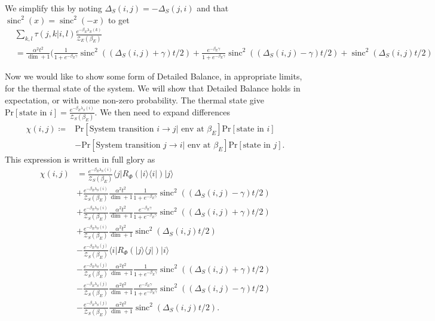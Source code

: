 \documentclass{article}
\newcommand{\ket}[1]{|#1\rangle}
\newcommand{\bra}[1]{\langle #1|}
\newcommand{\ketbra}[2]{| #1\rangle\! \langle #2|}
\newcommand{\prob}[1]{\text{Pr}\left[ #1 \right]}
\newcommand{\partfun}{\mathcal{Z}}
\DeclareMathOperator{\sinc}{sinc}
\begin{document}
We simplify this by noting $\Delta_S(i,j) = - \Delta_S(j,i)$ and that $\sinc^2(x) = \sinc^2(-x)$ to get
\begin{align}
&\sum_{k,l} \tau(j,k|i,l) \frac{e^{-\beta_E \lambda_E(k)}}{\partfun_E(\beta_E)} \\
&= \frac{\alpha^2 t^2}{\dim + 1} \bigg(\frac{1}{1 + e^{-\beta_E \gamma}} \sinc^2((\Delta_S(i,j) + \gamma)t/2) + \frac{e^{-\beta_E \gamma}}{1 + e^{-\beta_E \gamma}} \sinc^2((\Delta_S(i,j) - \gamma)t/2) + \sinc^2(\Delta_S(i,j)t/2)
\end{align}

Now we would like to show some form of Detailed Balance, in appropriate limits, for the thermal state of the system. We will show that Detailed Balance holds in expectation, or with some non-zero probability. The thermal state give $\prob{\text{state in } i} = \frac{e^{-\beta_E \lambda_S(i)}}{\partfun_S(\beta_E)}$. We then need to expand differences
\begin{align}
    \chi(i,j) \coloneqq &\prob{\text{System transition } i \to j | \text{ env at } \beta_E} \prob{\text{state in } i} \nonumber \\
    &- \prob{\text{System transition } j \to i | \text{ env at } \beta_E} \prob{\text{state in } j}.
\end{align}
This expression is written in full glory as
\begin{align}
    \chi(i,j) &= \frac{e^{-\beta_E \lambda_S(i)}}{\partfun_S(\beta_E)} \bra{j} R_{\Phi}(\ketbra{i}{i})\ket{j} \nonumber \\
    &+ \frac{e^{-\beta_E \lambda_S(i)}}{\partfun_S(\beta_E)} \frac{\alpha^2 t^2}{\dim + 1} \frac{1}{1 + e^{-\beta_E \gamma}} \sinc^2((\Delta_S(i,j) - \gamma) t/2) \nonumber \\
    &+\frac{e^{-\beta_E \lambda_S(i)}}{\partfun_S(\beta_E)} \frac{\alpha^2 t^2}{\dim + 1} \frac{e^{-\beta_E \gamma}}{1 + e^{-\beta_E \gamma}} \sinc^2((\Delta_S(i,j) + \gamma) t/2) \nonumber \\
    &+ \frac{e^{-\beta_E \lambda_S(i)}}{\partfun_S(\beta_E)} \frac{\alpha^2 t^2}{\dim + 1} \sinc^2(\Delta_S(i,j)t/2) \nonumber \\
    &-\frac{e^{-\beta_E \lambda_S(j)}}{\partfun_S(\beta_E)} \bra{i} R_{\Phi}(\ketbra{j}{j})\ket{i} \nonumber \\
    &- \frac{e^{-\beta_E \lambda_S(j)}}{\partfun_S(\beta_E)} \frac{\alpha^2 t^2}{\dim + 1} \frac{1}{1 + e^{-\beta_E \gamma}} \sinc^2((\Delta_S(i,j) + \gamma) t/2) \nonumber \\
    &-\frac{e^{-\beta_E \lambda_S(j)}}{\partfun_S(\beta_E)} \frac{\alpha^2 t^2}{\dim + 1} \frac{e^{-\beta_E \gamma}}{1 + e^{-\beta_E \gamma}} \sinc^2((\Delta_S(i,j) - \gamma) t/2) \nonumber \\
    &- \frac{e^{-\beta_E \lambda_S(j)}}{\partfun_S(\beta_E)} \frac{\alpha^2 t^2}{\dim + 1} \sinc^2(\Delta_S(i,j)t/2).
\end{align}
\end{document}
